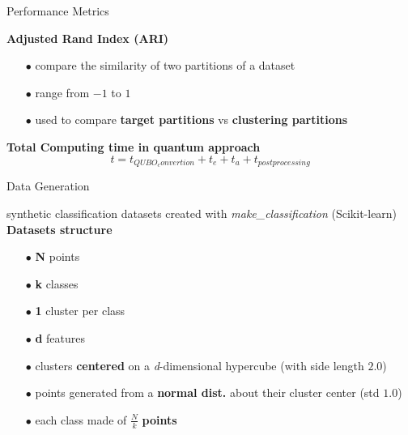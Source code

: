 		\begin{frame}{Performance Metrics}
						
			\textbf{Adjusted Rand Index (ARI)}
			\begin{itemize}
				\item[$\bullet$] compare the similarity of two partitions of a dataset
				\item[$\bullet$] range from $-1$ to $1$ 
				\item[$\bullet$] used to compare \textbf{target partitions} vs \textbf{clustering partitions} 
			\end{itemize}
			
			\textbf{Total Computing time in quantum approach}
			\begin{equation}
				t = t_{QUBO_convertion} + t_{e} + t_{a} + t_{postprocessing}
			\end{equation}

		
		\end{frame}

		\begin{frame}{Data Generation}

			synthetic classification datasets created with \textit{make\_classification} (Scikit-learn)	\\
			\textbf{Datasets structure}
			\begin{itemize}
				\item[$\bullet$] \textbf{N} points	
				\item[$\bullet$] \textbf{k} classes	
				\item[$\bullet$] \textbf{1} cluster per class	
				\item[$\bullet$] \textbf{d} features 
				\item[$\bullet$] clusters \textbf{centered} on a \textit{d}-dimensional hypercube (with side length $2.0$)  
				\item[$\bullet$] points generated from a \textbf{normal dist.} about their cluster center (std $1.0$)   
				\item[$\bullet$] each class made of $\frac{N}{k}$ \textbf{points}   
			\end{itemize}

			
		\end{frame}

